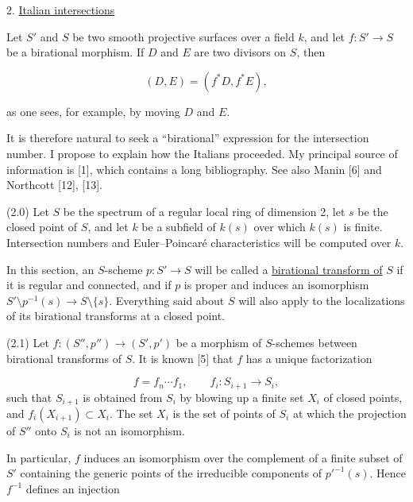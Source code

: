 2. \underline{Italian intersections}

Let $S'$ and $S$ be two smooth projective surfaces over a field $k$, and let
$f:S'\longrightarrow S$ be a birational morphism.  If $D$ and $E$ are two
divisors on $S$, then

\begin{equation*}
(D,E)=(f^*D,f^*E),
\end{equation*}


as one sees, for example, by moving $D$ and $E$.

It is therefore natural to seek a ``birational'' expression for the intersection
number.  I propose to explain how the Italians proceeded.  My principal source
of information is [1], which contains a long bibliography.  See also Manin [6]
and Northcott [12], [13].

(2.0) Let $S$ be the spectrum of a regular local ring of dimension 2, let $s$ be
the closed point of $S$, and let $k$ be a subfield of $k(s)$ over which $k(s)$ is
finite.  Intersection numbers and Euler--Poincaré characteristics will be
computed over $k$.

In this section, an $S$-scheme $p:S'\longrightarrow S$ will be called a
\underline{birational transform of} $S$ if it is regular and connected, and if
$p$ is proper and induces an isomorphism
$S'\setminus p^{-1}(s)\longrightarrow S\setminus\{s\}$.  Everything said about
$S$ will also apply to the localizations of its birational transforms at a
closed point.

(2.1) Let $f:(S'',p'')\longrightarrow(S',p')$ be a morphism of $S$-schemes
between birational transforms of $S$.  It is known [5] that $f$ has a unique
factorization

\begin{equation*}
f=f_n\cdots f_1,\qquad f_i:S_{i+1}\longrightarrow S_i,
\end{equation*}
such that $S_{i+1}$ is obtained from $S_i$ by blowing up a finite set $X_i$ of
closed points, and $f_i(X_{i+1})\subset X_i$.  The set $X_i$ is the set of points
of $S_i$ at which the projection of $S''$ onto $S_i$ is not an isomorphism.

In particular, $f$ induces an isomorphism over the complement of a finite subset
of $S'$ containing the generic points of the irreducible components of
$p'^{-1}(s)$.  Hence $f^{-1}$ defines an injection


